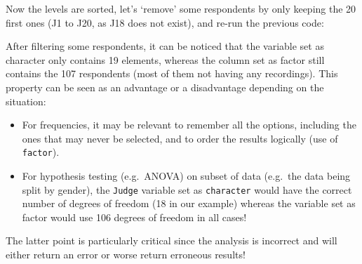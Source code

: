 \documentclass[
]{book}
\newenvironment{Shaded}{\begin{snugshade}}{\end{snugshade}}
\newcommand{\AttributeTok}[1]{\textcolor[rgb]{0.77,0.63,0.00}{#1}}
\newcommand{\DecValTok}[1]{\textcolor[rgb]{0.00,0.00,0.81}{#1}}
\newcommand{\FunctionTok}[1]{\textcolor[rgb]{0.00,0.00,0.00}{#1}}
\newcommand{\NormalTok}[1]{#1}
\newcommand{\OtherTok}[1]{\textcolor[rgb]{0.56,0.35,0.01}{#1}}
\newcommand{\SpecialCharTok}[1]{\textcolor[rgb]{0.00,0.00,0.00}{#1}}
\newcommand{\StringTok}[1]{\textcolor[rgb]{0.31,0.60,0.02}{#1}}
\providecommand{\tightlist}{%
  \setlength{\itemsep}{0pt}\setlength{\parskip}{0pt}}
\begin{document}
Now the levels are sorted, let's `remove' some respondents by only keeping the 20 first ones (J1 to J20, as J18 does not exist), and re-run the previous code:

\begin{Shaded}
\end{Shaded}

After filtering some respondents, it can be noticed that the variable set as character only contains 19 elements, whereas the column set as factor still contains the 107 respondents (most of them not having any recordings). This property can be seen as an advantage or a disadvantage depending on the situation:

\begin{itemize}
\tightlist
\item
  For frequencies, it may be relevant to remember all the options, including the ones that may never be selected, and to order the results logically (use of \texttt{factor}).
\item
  For hypothesis testing (e.g.~ANOVA) on subset of data (e.g.~the data being split by gender), the \texttt{Judge} variable set as \texttt{character} would have the correct number of degrees of freedom (18 in our example) whereas the variable set as factor would use 106 degrees of freedom in all cases!
\end{itemize}

The latter point is particularly critical since the analysis is incorrect and will either return an error or worse return erroneous results!
\end{document}
